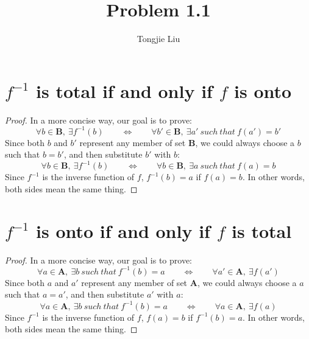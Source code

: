 \documentclass{article}
\title{Problem 1.1}
\author{Tongjie Liu}
\begin{document}
\maketitle


\section{$f^{-1}$ is total if and only if $f$ is onto}
\begin{proof}
	In a more concise way, our goal is to prove:
	\begin{equation*}
		\forall b \in \mathbf{B}, \  \exists f^{-1}(b)
		\qquad \Leftrightarrow \qquad
		\forall b' \in \mathbf{B}, \  \exists a' \ 
			such \  that \  f(a') = b'
	\end{equation*}
	Since both $b$ and $b'$ represent any member of set $\mathbf{B}$,
	we could always choose a $b$ such that $b = b'$, and then substitute
	$b'$ with $b$:
	\begin{equation*}
		\forall b \in \mathbf{B}, \  \exists f^{-1}(b)
		\qquad \Leftrightarrow \qquad
		\forall b \in \mathbf{B}, \  \exists a \ 
			such \  that \  f(a) = b
	\end{equation*}
	Since $f^{-1}$ is the inverse function of $f$, $f^{-1}(b) = a$ if
	$f(a) = b$. In other words, both sides mean the same thing. \qedhere
\end{proof}


\section{$f^{-1}$ is onto if and only if $f$ is total}
\begin{proof}
	In a more concise way, our goal is to prove:
	\begin{equation*}
		\forall a \in \mathbf{A}, \  \exists b \ 
			such \  that \  f^{-1}(b) = a
		\qquad \Leftrightarrow \qquad
		\forall a' \in \mathbf{A}, \  \exists f(a')
	\end{equation*}
	Since both $a$ and $a'$ represent any member of set $\mathbf{A}$,
	we could always choose a $a$ such that $a = a'$, and then substitute
	$a'$ with $a$:
	\begin{equation*}
		\forall a \in \mathbf{A}, \  \exists b \ 
			such \  that \  f^{-1}(b) = a
		\qquad \Leftrightarrow \qquad
		\forall a \in \mathbf{A}, \  \exists f(a)
	\end{equation*}
	Since $f^{-1}$ is the inverse function of $f$, $f(a) = b$ if
	$f^{-1}(b) = a$. In other words, both sides mean the same thing. \qedhere
\end{proof}
\end{document}
